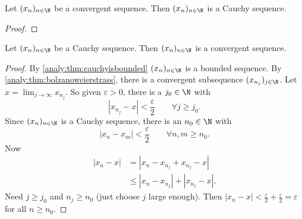 \documentclass[10pt, a4paper]{article}
\newcommand{\seq}[1][x]{(#1_n)_{n \in \N}}
\begin{document}
\begin{theorem}
    Let $\seq$ be a convergent sequence.
    Then $\seq$ is a Cauchy sequence.
    \begin{proof}
        
    \end{proof}
\end{theorem}

\begin{theorem}
    Let $\seq$ be a Cauchy sequence.
    Then $\seq$ is a convergent sequence.
    \begin{proof}
        By \autoref{analy:thm:cauchyisbounded} $\seq$ is a bounded sequence.
        By \autoref{analy:thm:bolzanoweierstrass},
        there is a convergent subsequence $(x_{n_j})_{j \in \N}$.
        Let $x = \lim_{j \to \infty}x_{n_j}$.
        So given $\varepsilon > 0$,
        there is a $j_0 \in \N$ with
        \[
        |x_{n_j} - x| < \frac{\varepsilon}{2}\qquad\forall j \geq j_0.
        \]
        Since $\seq$ is a Cauchy sequence,
        there is an $n_0 \in \N$ with
        \[
        |x_n - x_m| < \frac{\varepsilon}{2}\qquad\forall n, m \geq n_0.
        \]
        Now
        \begin{align*}
            |x_n - x| &= |x_n - x_{n_j} + x_{n_j} - x| \\
            &\leq |x_n - x_{n_j}| + |x_{n_j} - x|.
        \end{align*}
        Need $j \geq j_0$ and $n_j \geq n_0$
        (just choose $j$ large enough).
        Then $|x_n - x| < \frac{\varepsilon}{2} + \frac{\varepsilon}{2} = \varepsilon$ for all $n \geq n_0$.
    \end{proof}
\end{theorem}
\end{document}
